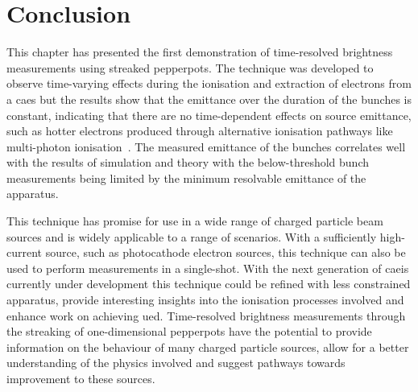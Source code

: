 \section{Conclusion}
This chapter has presented the first demonstration of time-resolved brightness measurements using streaked pepperpots.
The technique was developed to observe time-varying effects during the ionisation and extraction of electrons from a \gls{caes} but the results show that the emittance over the duration of the bunches is constant, indicating that there are no time-dependent effects on source emittance, such as hotter electrons produced through alternative ionisation pathways like multi-photon ionisation~\cite{speirs_identification_2017}.
The measured emittance of the bunches correlates well with the results of simulation and theory with the below-threshold bunch measurements being limited by the minimum resolvable emittance of the apparatus.

This technique has promise for use in a wide range of charged particle beam sources and is widely applicable to a range of scenarios.
With a sufficiently high-current source, such as photocathode electron sources, this technique can also be used to perform measurements in a single-shot.
With the next generation of \gls{caeis} currently under development this technique could be refined with less constrained apparatus, provide interesting insights into the ionisation processes involved and enhance work on achieving \gls{ued}.
Time-resolved brightness measurements through the streaking of one-dimensional pepperpots have the potential to provide information on the behaviour of many charged particle sources, allow for a better understanding of the physics involved and suggest pathways towards improvement to these sources.
